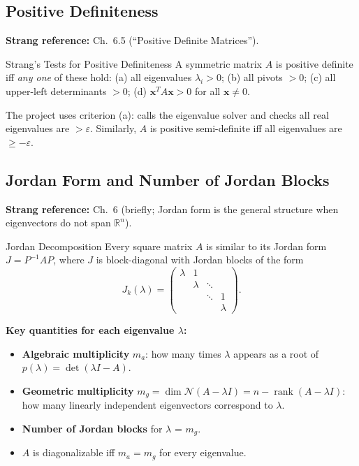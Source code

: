 \documentclass[12pt, a4paper]{article}
\newcommand{\R}{\mathbb{R}}
\newcommand{\Null}{\mathcal{N}}
\newcommand{\rank}{\operatorname{rank}}
\begin{document}
\subsection{Positive Definiteness}

\textbf{Strang reference:} Ch.\ 6.5 (``Positive Definite Matrices'').

\begin{strangbox}{Strang's Tests for Positive Definiteness}
A symmetric matrix $A$ is positive definite iff \emph{any one} of these hold:
(a) all eigenvalues $\lambda_i > 0$; (b) all pivots $> 0$; (c) all
upper-left determinants $> 0$; (d) $\mathbf{x}^T A \mathbf{x} > 0$ for all
$\mathbf{x} \neq 0$.
\end{strangbox}

The project uses criterion (a): calls the eigenvalue solver and checks all
real eigenvalues are $> \varepsilon$.  Similarly, $A$ is positive semi-definite
iff all eigenvalues are $\geq -\varepsilon$.

\subsection{Jordan Form and Number of Jordan Blocks}

\textbf{Strang reference:} Ch.\ 6 (briefly; Jordan form is the general
structure when eigenvectors do not span $\R^n$).

\begin{strangbox}{Jordan Decomposition}
Every square matrix $A$ is similar to its Jordan form $J = P^{-1}AP$, where
$J$ is block-diagonal with Jordan blocks of the form
\[
  J_k(\lambda) = \begin{pmatrix} \lambda & 1 & & \\ & \lambda & \ddots & \\ & & \ddots & 1 \\ & & & \lambda \end{pmatrix}.
\]
\end{strangbox}

\noindent
\textbf{Key quantities for each eigenvalue $\lambda$:}
\begin{itemize}[noitemsep]
  \item \textbf{Algebraic multiplicity} $m_a$: how many times $\lambda$
        appears as a root of $p(\lambda) = \det(\lambda I - A)$.
  \item \textbf{Geometric multiplicity} $m_g = \dim\Null(A - \lambda I) = n - \rank(A - \lambda I)$:
        how many linearly independent eigenvectors correspond to $\lambda$.
  \item \textbf{Number of Jordan blocks} for $\lambda$ = $m_g$.
  \item $A$ is diagonalizable iff $m_a = m_g$ for every eigenvalue.
\end{itemize}
\end{document}
